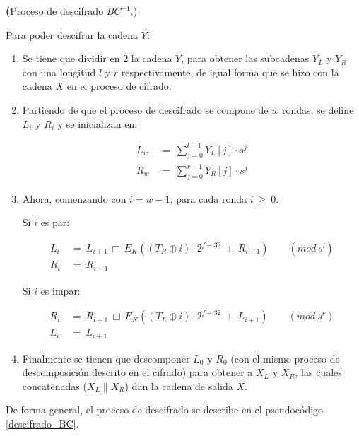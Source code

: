 \textbf(Proceso de descifrado $BC^{-1}$.)

Para poder descifrar la cadena $Y$:

\begin{enumerate}

  \item Se tiene que dividir en 2 la cadena $Y$, para obtener las subcadenas 
    $Y_L$ y $Y_R$ con una longitud $l$ y $r$ respectivamente, de igual forma 
    que se hizo con la cadena $X$ en el proceso de cifrado.    

  \item Partiendo de que el proceso de descifrado se compone de $w$ rondas, 
    se define $L_i$ y $R_i$ y se inicializan en:

    \begin{align}
      L_w\: &=\: \sum_{j=0}^{l-1} Y_L[j] \cdot s^j \\
      R_w\: &=\: \sum_{j=0}^{r-1} Y_R[j] \cdot s^j
    \end{align}
  
  \item Ahora, comenzando con $i=w-1$, para cada ronda $i\: \geq\: 0$.

    Si $i$ es par:

    \begin{align}
      L_i\: &=\: L_{i+1}\: \boxminus\: 
                E_K((T_R \oplus i) \cdot 2^{f-32}\: +\: R_{i+1})\qquad 
                (mod\ s^l) \\
      R_i\: &=\: R_{i+1}
    \end{align}

    Si $i$ es impar:

    \begin{align}
      R_i\: &=\: R_{i+1}\: \boxminus\: 
                E_K((T_L \oplus i) \cdot 2^{f-32}\: +\: L_{i+1})\qquad 
                (mod\ s^r) \\
      L_i\: &=\: L_{i+1}
    \end{align}
  
  \item Finalmente se tienen que descomponer $L_0$ y $R_0$ (con el mismo 
    proceso de descomposición descrito en el cifrado) para obtener a $X_L$ y 
    $X_R$, las cuales concatenadas ($X_L \parallel X_R$) dan la cadena de 
    salida $X$.

\end{enumerate}

De forma general, el proceso de descifrado se describe en el pseudocódigo 
\ref{descifrado_BC}.

